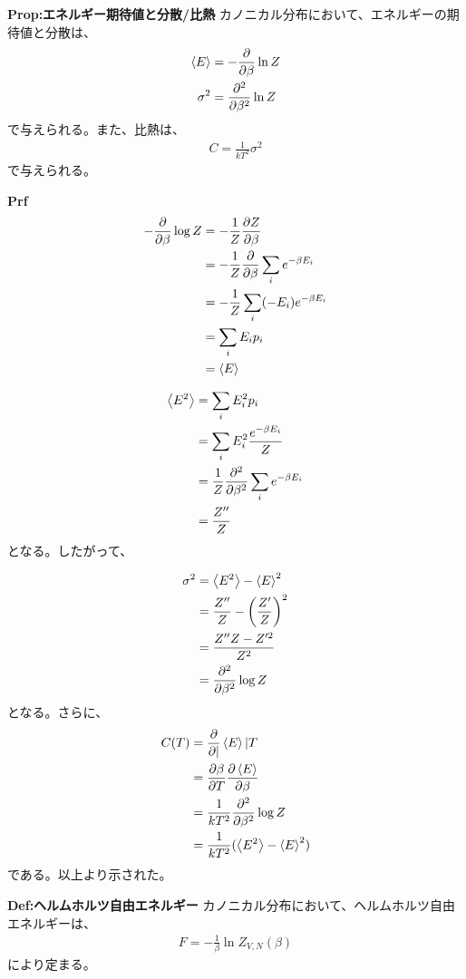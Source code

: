 \documentclass[a4paper,11pt]{jsarticle}
\numberwithin{equation}{section}
\begin{document}
\begin{itembox}[l]{\textbf{Prop:エネルギー期待値と分散/比熱}}
  カノニカル分布において、エネルギーの期待値と分散は、
  \begin{align}
    \expval{E} &= -\pdv{\beta}\ln Z\\
    \sigma^2 &= \pdv[2]{\beta}\ln Z
  \end{align}
  で与えられる。また、比熱は、
  \begin{align}
    C = \frac{1}{kT^2}\sigma^2
  \end{align}
  で与えられる。

\end{itembox}
\textbf{Prf}\\
\begin{align}
  -\pdv{\beta}\log Z &= -\frac{1}{Z}\pdv{Z}{\beta}\\
  &= -\frac{1}{Z}\pdv{}{\beta}\sum_{i}e^{-\beta E_{i}}\\
  &= -\frac{1}{Z}\sum_{i}(-E_{i})e^{-\beta E_{i}}\\
  &= \sum_{i}E_{i}p_{i}\\
  &= \expval{E}
\end{align}

\begin{align}
  \ev{E^2} &= \sum_{i}E_{i}^2p_{i}\\
  &=\sum_{i}E_{i}^2\frac{e^{-\beta E_{i}}}{Z}\\
  &=\frac{1}{Z}\pdv[2]{\beta}\sum_{i}e^{-\beta E_{i}}\\
  &=\frac{Z''}{Z}
\end{align}
となる。したがって、

\begin{align}
  \sigma^2 &= \ev{E^2} - \ev{E}^2\\
  &= \frac{Z''}{Z} - \left( \frac{Z'}{Z} \right)^2\\
  &= \frac{Z''Z - Z'^2}{Z^2}\\
  &=\pdv[2]{\beta}\log Z
\end{align}
となる。さらに、
\begin{align}
  C(T)&=\pdv|\ev{E}|{T}\\
  &=\pdv{\beta}{T}\pdv{\ev{E}}{\beta}\\
  &=\frac{1}{kT^2}\pdv[2]{\beta}\log Z\\
  &=\frac{1}{kT^2}(\ev{E^2}-\ev{E}^2)
\end{align}
である。以上より示された。\hfill\qedsymbol\\

\begin{itembox}[l]{\textbf{Def:ヘルムホルツ自由エネルギー}}
  カノニカル分布において、ヘルムホルツ自由エネルギーは、
  \begin{align}
    F = -\frac{1}{\beta}\ln Z_{V,N}(\beta) \label{eq:helmholtz}
  \end{align}
  により定まる。
\end{itembox}
\end{document}
